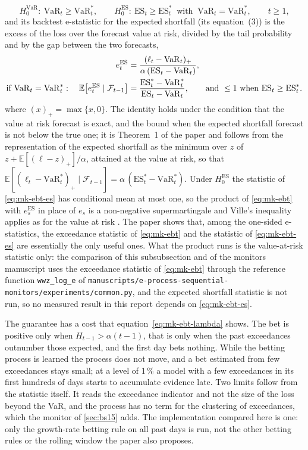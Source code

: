 \begin{equation}
H_0^{\mathrm{VaR}}:\ \mathrm{VaR}_t\ge\mathrm{VaR}^{*}_t,\qquad
H_0^{\mathrm{ES}}:\ \mathrm{ES}_t\ge\mathrm{ES}^{*}_t\ \text{ with }\ \mathrm{VaR}_t=\mathrm{VaR}^{*}_t,\qquad t\ge1,
\label{eq:mk-ebt-null}
\end{equation}
and its backtest e-statistic for the expected shortfall (its equation~(3)) is the excess of the loss over the forecast value at risk, divided by the tail probability and by the gap between the two forecasts,
\begin{align}
e^{\mathrm{ES}}_t&=\frac{(\ell_t-\mathrm{VaR}_t)_{+}}{\alpha\,(\mathrm{ES}_t-\mathrm{VaR}_t)},\label{eq:mk-ebt-es}\\
\text{if }\mathrm{VaR}_t=\mathrm{VaR}^{*}_t:\quad
\mathbb E\!\left[e^{\mathrm{ES}}_t\mid\mathcal F_{t-1}\right]&=\frac{\mathrm{ES}^{*}_t-\mathrm{VaR}^{*}_t}{\mathrm{ES}_t-\mathrm{VaR}_t},\qquad
\text{and }\le1\ \text{when }\mathrm{ES}_t\ge\mathrm{ES}^{*}_t.\notag
\end{align}
where $(x)_{+}=\max\{x,0\}$. The identity holds under the condition that the value at risk forecast is exact, and the bound when the expected shortfall forecast is not below the true one; it is Theorem~1 of the paper and follows from the representation of the expected shortfall as the minimum over $z$ of $z+\mathbb E[(\ell-z)_{+}]/\alpha$, attained at the value at risk, so that $\mathbb E[(\ell_t-\mathrm{VaR}^{*}_t)_{+}\mid\mathcal F_{t-1}]=\alpha\,(\mathrm{ES}^{*}_t-\mathrm{VaR}^{*}_t)$. Under $H_0^{\mathrm{ES}}$ the statistic of \cref{eq:mk-ebt-es} has conditional mean at most one, so the product of \cref{eq:mk-ebt} with $e^{\mathrm{ES}}_s$ in place of $e_s$ is a non-negative supermartingale and Ville's inequality applies as for the value at risk \citep{proposed:wang2022}. The paper shows that, among the one-sided e-statistics, the exceedance statistic of \cref{eq:mk-ebt} and the statistic of \cref{eq:mk-ebt-es} are essentially the only useful ones. What the product runs is the value-at-risk statistic only: the comparison of this subsubsection and of the monitors manuscript uses the exceedance statistic of \cref{eq:mk-ebt} through the reference function \texttt{wwz\_log\_e} of \texttt{manuscripts/e-process-sequential-monitors/experiments/common.py}, and the expected shortfall statistic is not run, so no measured result in this report depends on \cref{eq:mk-ebt-es}.

The guarantee has a cost that equation~\eqref{eq:mk-ebt-lambda} shows. The bet is positive only when $H_{t-1}>\alpha(t-1)$, that is only when the
past exceedances outnumber those expected, and the first day bets nothing. While the betting process is learned the process does not move, and a
bet estimated from few exceedances stays small; at a level of 1\,\% a model with a few exceedances in its first hundreds of days starts to
accumulate evidence late. Two limits follow from the statistic itself. It reads the exceedance indicator and not the size of the loss beyond the VaR,
and the process has no term for the clustering of exceedances, which the monitor of \cref{sec:bs15} adds. The implementation compared here is one:
only the growth-rate betting rule on all past days is run, not the other betting rules or the rolling window the paper also proposes.

